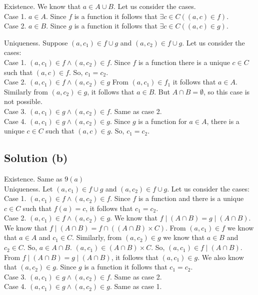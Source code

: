 \documentclass{article}
\begin{document}
Existence. We know that $a \in A \cup B$. Let us consider the cases.
\\ Case 1. $a \in A$. Since $f$ is a function it follows that $\exists c
\in C((a,c) \in f)$.
\\ Case 2. $a \in B$. Since $g$ is a function it follows that $\exists c
\in C((a,c) \in g)$.

Uniqueness. Suppose $(a,c_1) \in f \cup g$ and $(a,c_2) \in f \cup g$.
Let us consider the cases:
\\ Case 1. $(a,c_1) \in f \land (a,c_2) \in f$. Since $f$ is a
function there is a unique $c \in C$ such that $(a,c) \in f$. So, $c_1
= c_2$.
\\ Case 2. $(a,c_1) \in f \land (a,c_2) \in g$ From $(a,c_1) \in f_1$
it follows that $a \in A$. Similarly from $(a,c_2) \in g$, it follows
that $a \in B$. But $A \cap B = \emptyset$, so this case is not
possible.
\\ Case 3. $(a,c_1) \in g \land (a,c_2) \in f$. Same as case 2.
\\ Case 4. $(a,c_1) \in g \land (a,c_2) \in g$. Since $g$ is a
function for $a \in A$, there is a unique $c \in C$ such that $(a,c)
\in g$. So, $c_1 = c_2$.

\subsection{Solution (b)}

Existence. Same as $9(a)$
\\ Uniqueness. Let $(a,c_1) \in f \cup g$ and $(a,c_2) \in f \cup g$.
Let us consider the cases:
\\ Case 1. $(a,c_1) \in f \land (a,c_2) \in f$. Since $f$ is a function
and there is a unique $c \in C$ such that $f(a) = c$, it follows that
$c_1 = c_2$.
\\ Case 2. $(a,c_1) \in f \land (a,c_2) \in g$. We know that $f \mid
(A \cap B) = g \mid (A \cap B)$. We know that $f \mid (A \cap B) = f
\cap ((A \cap B) \times C)$. From $(a,c_1) \in f$ we know that $a \in
A$ and $c_1 \in C$. Similarly, from $(a,c_2) \in g$ we know that $a \in
B$ and $c_2 \in C$. So, $a \in A \cap B$. $(a,c_1) \in (A \cap B)
\times C$. So, $(a,c_1) \in f \mid (A \cap B)$. From $f \mid (A \cap
B) = g \mid (A \cap B)$, it follows that $(a,c_1) \in g$. We also know
that $(a,c_2) \in g$. Since $g$ is a function it follows that $c_1 = c_2$.
\\ Case 3. $(a,c_1) \in g \land (a,c_2) \in f$. Same as case 2.
\\ Case 4. $(a,c_1) \in g \land (a,c_2) \in g$. Same as case 1.
\end{document}
